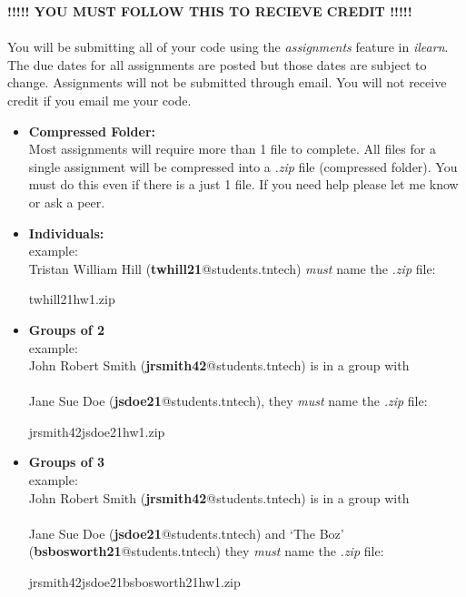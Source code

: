 \documentclass[12pt]{article}
\begin{document}
    
	{\bf !!!!! YOU MUST FOLLOW THIS TO RECIEVE CREDIT !!!!!}\\\\
    You will be submitting all of your code using the {\it assignments} feature in {\it ilearn}. The due dates for all assignments are posted but those dates are subject to change. Assignments will not be submitted through email. You will not receive credit if you email me your code. \\
    
    \begin{itemize}
    
    	\item {\bf Compressed Folder:}\\
Most assignments will require more than 1 file to complete. All files for a single assignment will be compressed into a {\it .zip} file (compressed folder). You must do this even if there is a just 1 file. If you need help please let me know or ask a peer. 
    
        \item  {\bf Individuals:}\\ 
        example:\\ Tristan William Hill ({\bf twhill21}@students.tntech) {\it must} name the {\it .zip} file:
        \begin{framed}
        {\selectfont
        {twhill21\textunderscore hw1.zip}               
        }\end{framed}
        
        \item {\bf Groups of 2} \\ \vspace{2mm}
        example:\\ John Robert Smith ({\bf jrsmith42}@students.tntech) is in a group with \\\\ Jane Sue Doe ({\bf jsdoe21}@students.tntech),
        they {\it must} name the {\it .zip} file: 
        \begin{framed}
        {\selectfont
        { jrsmith42\textunderscore jsdoe21\textunderscore hw1.zip}    
        }\end{framed}
        
        \item {\bf Groups of 3} \\ \vspace{2mm}
        example:\\ John Robert Smith ({\bf jrsmith42}@students.tntech) is in a group with \\\\ Jane Sue Doe ({\bf jsdoe21}@students.tntech) and `The Boz' ({\bf bsbosworth21}@students.tntech)
        they {\it must} name the {\it .zip} file: 
        \begin{framed}
        {\selectfont
        { jrsmith42\textunderscore jsdoe21\textunderscore bsbosworth21\textunderscore hw1.zip}    
        }\end{framed}
        

\end{itemize}
\end{document}
